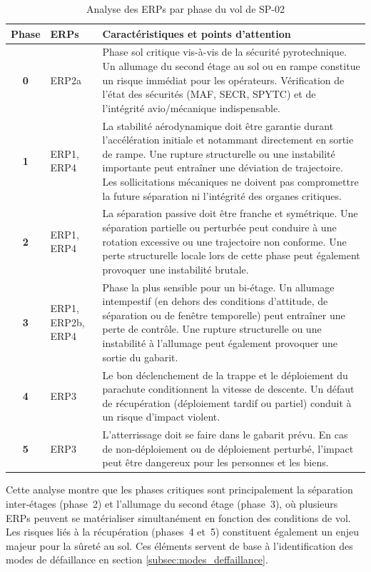 \begin{table}[h!]
\centering
\begin{tabular}{|c|p{1.3cm}|p{12cm}|}
\hline
\textbf{Phase} &
\textbf{\acrshort{ERPs}} &
\textbf{Caractéristiques et points d’attention} \\ \hline

\textbf{0} &
ERP2a &
Phase sol critique vis-à-vis de la sécurité pyrotechnique. Un allumage du second étage au sol ou en rampe constitue un risque
immédiat pour les opérateurs. Vérification de l’état des sécurités (MAF, SECR, SPYTC) et de l’intégrité avio/mécanique
indispensable. 
\\ \hline

\textbf{1} &
ERP1, ERP4 &
La stabilité aérodynamique doit être garantie durant l’accélération initiale et notammant directement en sortie de rampe. Une
rupture structurelle ou une instabilité importante peut entraîner une déviation de trajectoire. Les sollicitations mécaniques ne
doivent pas compromettre la future séparation ni l’intégrité des organes critiques. 
\\ \hline

\textbf{2} &
ERP1, ERP4 &
La séparation passive doit être franche et symétrique. Une séparation partielle ou perturbée peut conduire à une rotation
excessive ou une trajectoire non conforme. Une perte structurelle locale lors de cette phase peut également provoquer une
instabilité brutale. 
\\ \hline

\textbf{3} &
ERP1, ERP2b, ERP4 &
Phase la plus sensible pour un bi-étage. Un allumage intempestif (en dehors des conditions d’attitude, de séparation ou de
fenêtre temporelle) peut entraîner une perte de contrôle. Une rupture structurelle ou une instabilité à l’allumage peut
également provoquer une sortie du gabarit. 
\\ \hline

\textbf{4} &
ERP3 &
Le bon déclenchement de la trappe et le déploiement du parachute conditionnent la vitesse de descente. Un défaut de récupération
(déploiement tardif ou partiel) conduit à un risque d’impact violent. 
\\ \hline

\textbf{5} &
ERP3 &
L’atterrissage doit se faire dans le gabarit prévu. En cas de non-déploiement ou de déploiement perturbé, l’impact peut être 
dangereux pour les personnes et les biens. 
\\ \hline

\end{tabular}
\caption{Analyse des \acrshort{ERPs} par phase du vol de SP-02}
\label{tab:ERP_par_phase}
\end{table}

Cette analyse montre que les phases critiques sont principalement la séparation inter-étages (phase~2) et l’allumage du second
étage (phase~3), où plusieurs \acrshort{ERPs} peuvent se matérialiser simultanément en fonction des conditions de vol. Les
risques liés à la récupération (phases~4 et~5) constituent également un enjeu majeur pour la sûreté au sol. Ces éléments servent
de base à l’identification des modes de défaillance en section \ref{subsec:modes_deffaillance}.

\newpage
